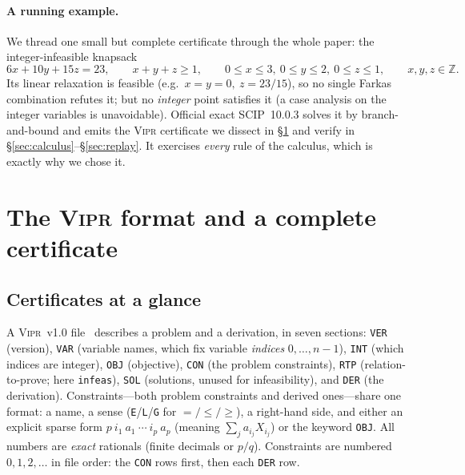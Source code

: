\documentclass[runningheads]{llncs}
\newcommand{\code}[1]{\texttt{#1}}
\newcommand{\Z}{\mathbb{Z}}
\newcommand{\scip}{\textsc{SCIP}}
\newcommand{\vipr}{\textsc{Vipr}}
\begin{document}
\paragraph{A running example.} We thread one small but complete certificate through the
whole paper: the integer-infeasible knapsack
\begin{equation}\label{eq:knap}
6x+10y+15z=23,\qquad x+y+z\ge1,\qquad 0\le x\le3,\ 0\le y\le2,\ 0\le z\le1,\qquad x,y,z\in\Z.
\end{equation}
Its linear relaxation is feasible (e.g.\ $x{=}y{=}0,\ z{=}23/15$), so no single Farkas
combination refutes it; but no \emph{integer} point satisfies it (a case analysis on the
integer variables is unavoidable). Official exact \scip{}~10.0.3 solves it by
branch-and-bound and emits the \vipr{} certificate we dissect in \S\ref{sec:format} and
verify in \S\ref{sec:calculus}--\S\ref{sec:replay}. It exercises \emph{every} rule of the
calculus, which is exactly why we chose it.

\section{The \vipr{} format and a complete certificate}\label{sec:format}

\subsection{Certificates at a glance}
A \vipr~v1.0 file~\cite{vipr} describes a problem and a derivation, in seven sections:
\code{VER} (version), \code{VAR} (variable names, which fix variable \emph{indices}
$0,\dots,n{-}1$), \code{INT} (which indices are integer), \code{OBJ} (objective),
\code{CON} (the problem constraints), \code{RTP} (relation-to-prove; here
\code{infeas}), \code{SOL} (solutions, unused for infeasibility), and \code{DER} (the
derivation). Constraints---both problem constraints and derived ones---share one format:
a name, a sense (\code{E}/\code{L}/\code{G} for $=/\le/\ge$), a right-hand side, and
either an explicit sparse form $p\ i_1\ a_1\ \cdots\ i_p\ a_p$ (meaning
$\sum_j a_{i_j}X_{i_j}$) or the keyword \code{OBJ}. All numbers are \emph{exact}
rationals (finite decimals or $p/q$). Constraints are numbered $0,1,2,\dots$ in file
order: the \code{CON} rows first, then each \code{DER} row.
\end{document}
